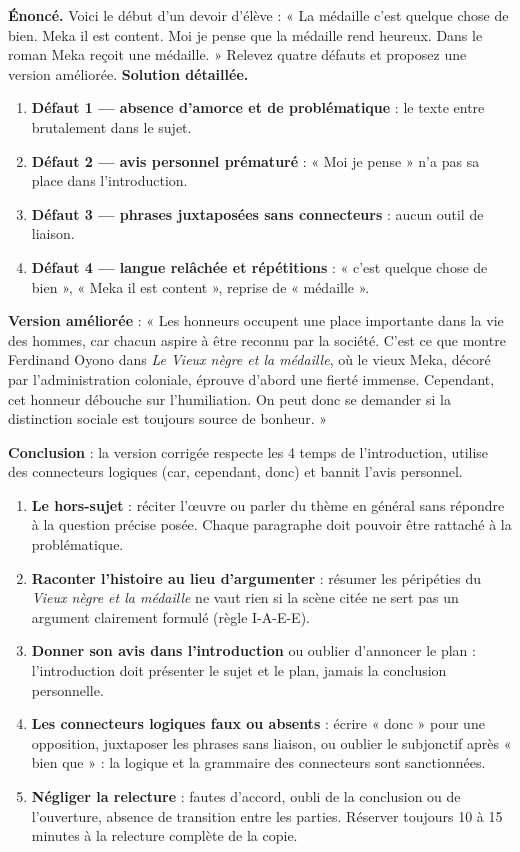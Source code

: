 \documentclass[11pt]{article}
\begin{document}
\begin{exoresolu}
\textbf{Énoncé.} Voici le début d'un devoir d'élève : « La médaille c'est quelque chose de bien. Meka il est content. Moi je pense que la médaille rend heureux. Dans le roman Meka reçoit une médaille. » Relevez quatre défauts et proposez une version améliorée.
\tcblower
\textbf{Solution détaillée.}
\begin{enumerate}
\item \textbf{Défaut 1 — absence d'amorce et de problématique} : le texte entre brutalement dans le sujet.
\item \textbf{Défaut 2 — avis personnel prématuré} : « Moi je pense » n'a pas sa place dans l'introduction.
\item \textbf{Défaut 3 — phrases juxtaposées sans connecteurs} : aucun outil de liaison.
\item \textbf{Défaut 4 — langue relâchée et répétitions} : « c'est quelque chose de bien », « Meka il est content », reprise de « médaille ».
\end{enumerate}
\textbf{Version améliorée} : « Les honneurs occupent une place importante dans la vie des hommes, car chacun aspire à être reconnu par la société. C'est ce que montre Ferdinand Oyono dans \emph{Le Vieux nègre et la médaille}, où le vieux Meka, décoré par l'administration coloniale, éprouve d'abord une fierté immense. Cependant, cet honneur débouche sur l'humiliation. On peut donc se demander si la distinction sociale est toujours source de bonheur. »

\textbf{Conclusion} : la version corrigée respecte les 4 temps de l'introduction, utilise des connecteurs logiques (car, cependant, donc) et bannit l'avis personnel.
\end{exoresolu}

\begin{attention}
\begin{enumerate}
\item \textbf{Le hors-sujet} : réciter l'œuvre ou parler du thème en général sans répondre à la question précise posée. Chaque paragraphe doit pouvoir être rattaché à la problématique.
\item \textbf{Raconter l'histoire au lieu d'argumenter} : résumer les péripéties du \emph{Vieux nègre et la médaille} ne vaut rien si la scène citée ne sert pas un argument clairement formulé (règle I-A-E-E).
\item \textbf{Donner son avis dans l'introduction} ou oublier d'annoncer le plan : l'introduction doit présenter le sujet et le plan, jamais la conclusion personnelle.
\item \textbf{Les connecteurs logiques faux ou absents} : écrire « donc » pour une opposition, juxtaposer les phrases sans liaison, ou oublier le subjonctif après « bien que » : la logique et la grammaire des connecteurs sont sanctionnées.
\item \textbf{Négliger la relecture} : fautes d'accord, oubli de la conclusion ou de l'ouverture, absence de transition entre les parties. Réserver toujours 10 à 15 minutes à la relecture complète de la copie.
\end{enumerate}
\end{attention}
\end{document}
